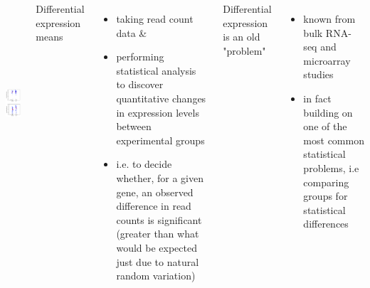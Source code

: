 \documentclass{beamer}\usepackage[]{graphicx}\usepackage[]{color}
\begin{document}
\begin{frame}
\begin{columns}

\includegraphics[width=4.5cm, height=7.5cm]{Images/Wu-2017-01.png}

Differential expression means
\scriptsize
\begin{itemize}
  \item taking read count data \&
  \item performing statistical analysis to discover quantitative changes in expression levels between experimental groups
  \item i.e. to decide whether, for a given gene, an observed difference in read counts is significant (greater than what would be expected just due to natural random variation)
 \end{itemize} \pause
\vspace{0.5cm}
\normalsize 
Differential expression is an old "problem"
\scriptsize
\begin{itemize}
  \item known from bulk RNA-seq and microarray studies
  \item in fact building on one of the most common statistical problems, i.e comparing groups for statistical differences
 \end{itemize}

\end{columns}
\end{frame}
\end{document}
